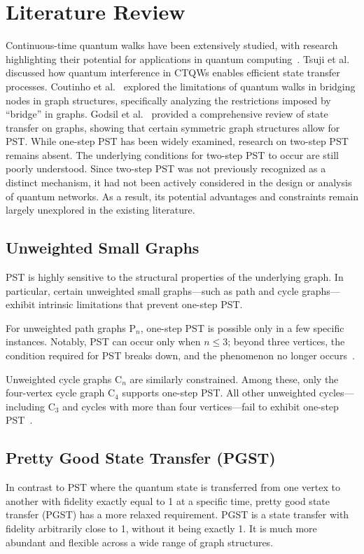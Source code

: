 \documentclass[reprint, aps, 12pt, floatfix]{revtex4-2}
\begin{document}
\section{Literature Review}
Continuous-time quantum walks have been extensively studied, with research highlighting their potential for applications in quantum computing~\cite{KempeJ2003QrwA}. Tsuji et al.~\cite{TsujiYuta2018QIGW} discussed how quantum interference in CTQWs enables efficient state transfer processes. Coutinho et al.~\cite{CoutinhoGabriel2022Qwdn} explored the limitations of quantum walks in bridging nodes in graph structures, specifically analyzing the restrictions imposed by ``bridge'' in graphs. Godsil et al.~\cite{GodsilChris2012Nnoc} provided a comprehensive review of state transfer on graphs, showing that certain symmetric graph structures allow for PST. While one-step PST has been widely examined, research on two-step PST remains absent. The underlying conditions for two-step PST to occur are still poorly understood. Since two-step PST was not previously recognized as a distinct mechanism, it had not been actively considered in the design or analysis of quantum networks. As a result, its potential advantages and constraints remain largely unexplored in the existing literature.

\subsection{Unweighted Small Graphs}
PST is highly sensitive to the structural properties of the underlying graph. In particular, certain unweighted small graphs—such as path and cycle graphs—exhibit intrinsic limitations that prevent one-step PST.

For unweighted path graphs P$_n$, one-step PST is possible only in a few specific instances. Notably, PST can occur only when $ n \leq 3 $; beyond three vertices, the condition required for PST breaks down, and the phenomenon no longer occurs~\cite{Kendon:2011:1546-1955:422}.

Unweighted cycle graphs C$_n$ are similarly constrained. Among these, only the four-vertex cycle graph C$_4$ supports one-step PST. All other unweighted cycles—including C$_3$ and cycles with more than four vertices—fail to exhibit one-step PST~\cite{Kendon:2011:1546-1955:422}.

\subsection{Pretty Good State Transfer (PGST)}
In contrast to PST where the quantum state is transferred from one vertex to another with fidelity exactly equal to 1 at a specific time, pretty good state transfer (PGST) has a more relaxed requirement. PGST is a state transfer with fidelity arbitrarily close to 1, without it being exactly 1. It is much more abundant and flexible across a wide range of graph structures.
\end{document}
